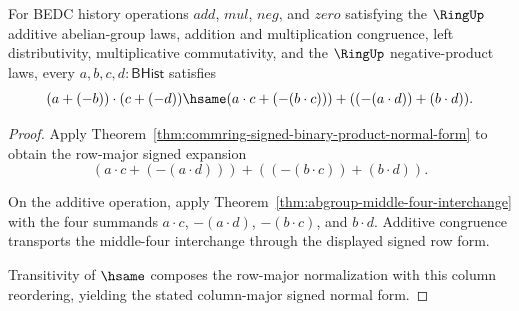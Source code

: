 \begin{theorem}
\label{thm:commring-signed-column-binary-product-normal-form}
For BEDC history operations $add$, $mul$, $neg$, and $zero$ satisfying the
$\RingUp$ additive abelian-group laws, addition and multiplication
congruence, left distributivity, multiplicative commutativity, and the
$\RingUp$ negative-product laws, every $a,b,c,d : \mathsf{BHist}$ satisfies
$$
(a+(-b))\cdot(c+(-d))\hsame
(a\cdot c+(-(b\cdot c)))+((-(a\cdot d))+(b\cdot d)).
$$
\end{theorem}
\begin{proof}
Apply Theorem~\ref{thm:commring-signed-binary-product-normal-form} to obtain
the row-major signed expansion
$$
(a\cdot c+(-(a\cdot d)))+((-(b\cdot c))+(b\cdot d)).
$$

On the additive operation, apply
Theorem~\ref{thm:abgroup-middle-four-interchange} with the four summands
$a\cdot c$, $-(a\cdot d)$, $-(b\cdot c)$, and $b\cdot d$. Additive congruence
transports the middle-four interchange through the displayed signed row form.

Transitivity of $\hsame$ composes the row-major normalization with this
column reordering, yielding the stated column-major signed normal form.
\end{proof}

